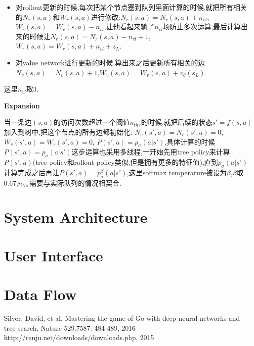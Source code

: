 \documentclass[twocolumn]{article}
\begin{document}
\begin{itemize}
	\item 对rollout更新的时候,每次把某个节点塞到队列里面计算的时候,就把所有相关的$N_r(s,a)$和$W_r(s,a)$进行修改:$N_r(s,a)=N_r(s,a)+n_{vl}$, $W_r(s,a)=W_r(s,a)-n_{vl}$,让他看起来输了$n_{vl}$场防止多次运算,最后计算出来的时候让$N_r(s,a)=N_r(s,a)-n_{vl}+1$, $W_r(s,a)=W_r(s,a)+n_{vl}+z_L$.
	\item 对value network进行更新的时候,算出来之后更新所有相关的边$N_v(s,a)=N_v(s,a)+1$,$W_v(s,a)=W_v(s,a)+v_\theta(s_L)$.
\end{itemize}

这里$n_{vl}$取$3$.

\noindent\textbf{Expansion}

当一条边$(s, a)$的访问次数超过一个阀值$n_{thr}$的时候,就把后续的状态$s'=f(s,a)$加入到树中,把这个节点的所有边都初始化: $N_v(s',a)=N_r(s',a)=0$,$W_v(s',a)=W_r(s',a)=0$, $P(s',a)=p_\sigma(a|s')$,具体计算的时候$P(s',a)=p_\sigma(a|s')$这步运算也采用多线程,一开始先用tree policy来计算$P(s',a)$(tree policy和rollout policy类似,但是拥有更多的特征值),直到$p_\sigma(a|s')$计算完成之后再让$P(s',a)=p_\sigma^\beta(a|s')$,这里softmax temperature被设为$\beta$,$\beta$取$0.67$,$n_{thr}$需要与实际队列的情况相契合.

\section{System Architecture}

\section{User Interface}

\section{Data Flow}

\begin{thebibliography}{1}
Silver, David, et al. Mastering the game of Go with deep neural networks and tree search, Nature 529.7587: 484-489, 2016
http://renju.net/downloads/downloads.php, 2015
\end{thebibliography}
\end{document}
